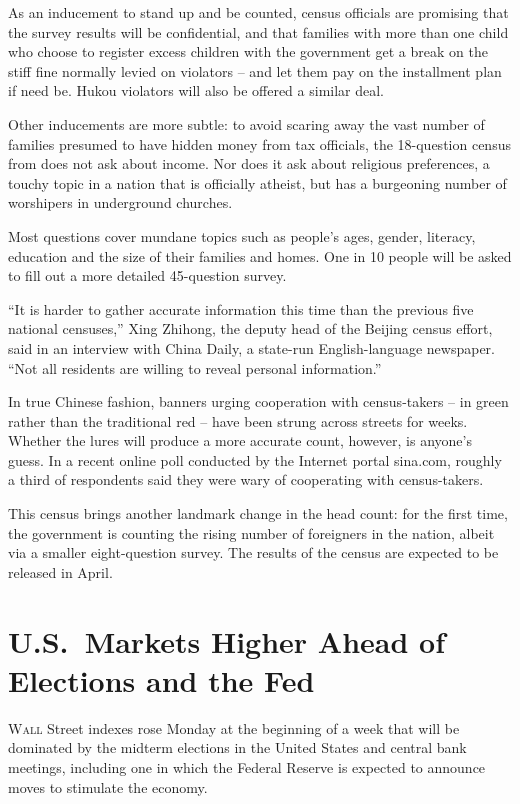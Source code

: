 ﻿\documentclass[12pt]{article}
\begin{document}
As an inducement to stand up and be counted, census officials are promising that the survey results
will be confidential, and that families with more than one child who choose to register excess
children with the government get a break on the stiff fine normally levied on violators -- and let
them pay on the installment plan if need be. Hukou violators will also be offered a similar deal.

Other inducements are more subtle: to avoid scaring away the vast number of families presumed to
have hidden money from tax officials, the 18-question census from does not ask about income. Nor
does it ask about religious preferences, a touchy topic in a nation that is officially atheist, but
has a burgeoning number of worshipers in underground churches.

Most questions cover mundane topics such as people's ages, gender, literacy, education and the size
of their families and homes. One in 10 people will be asked to fill out a more detailed 45-question
survey.

``It is harder to gather accurate information this time than the previous five national censuses,''
Xing Zhihong, the deputy head of the Beijing census effort, said in an interview with China Daily, a
state-run English-language newspaper. ``Not all residents are willing to reveal personal
information.''

In true Chinese fashion, banners urging cooperation with census-takers -- in green rather than the
traditional red -- have been strung across streets for weeks. Whether the lures will produce a more
accurate count, however, is anyone's guess. In a recent online poll conducted by the Internet portal
sina.com, roughly a third of respondents said they were wary of cooperating with census-takers.

This census brings another landmark change in the head count: for the first time, the government is
counting the rising number of foreigners in the nation, albeit via a smaller eight-question survey.
The results of the census are expected to be released in April.


\section{U.S.~Markets Higher Ahead of Elections and the Fed}

\lettrine{W}{all} Street indexes rose Monday at the beginning of a week that
will be dominated by the midterm elections in the United States and central bank meetings, including
one in which the Federal Reserve is expected to announce moves to stimulate the economy.
\end{document}
